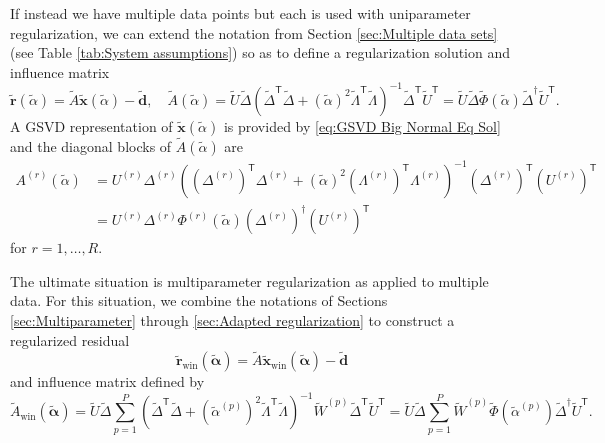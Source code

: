 \documentclass[12pt]{article}
\newcommand{\dVec}{\mathbf{d}}	%
\newcommand{\rVec}{\mathbf{r}}	%
\newcommand{\xVec}{\mathbf{x}}	%
\newcommand{\trans}[1]{{#1}^\mathsf{T}}	%
\newcommand{\inv}[1]{{#1}^{-1}}	%
\newcommand{\pinv}[1]{{#1}^\dagger}	%
\newcommand{\regparam}{\alpha}  %
\newcommand{\regparamVec}{\bm{\regparam}}   %
\newcommand{\regparamBig}{\widetilde{\regparam}}   %
\newcommand{\regparamVecBig}{\widetilde{\regparamVec}}   %
\newcommand{\xBig}{\widetilde{\xVec}}	%
\newcommand{\xWinBig}{\xBig_{\text{win}}}	%
\newcommand{\rBig}{\widetilde{\rVec}}	%
\newcommand{\rWinBig}{\rBig_{\text{win}}}	%
\newcommand{\dBig}{\widetilde{\dVec}}	%
\newcommand{\ABig}{\widetilde{A}}	%
\newcommand{\AWinBig}{\widetilde{A}_{\text{win}}}	%
\begin{document}
If instead we have multiple data points but each is used with uniparameter regularization, we can extend the notation from Section \ref{sec:Multiple data sets} (see Table \ref{tab:System assumptions}) so as to define a regularization solution and influence matrix
\begin{equation}
\label{eq:Big regularized residual}
\rBig(\widetilde{\regparam}) = \ABig\xBig(\widetilde{\regparam}) - \dBig, \quad \ABig(\regparamBig) = \widetilde{U}\widetilde{\Delta}\inv{\left(\trans{\widetilde{\Delta}}\widetilde{\Delta} + \left(\regparamBig\right)^2 \trans{\widetilde{\Lambda}}\widetilde{\Lambda}\right)}\trans{\widetilde{\Delta}}\trans{\widetilde{U}} = \widetilde{U}\widetilde{\Delta}\widetilde{\Phi}\left(\regparamBig\right)\pinv{\widetilde{\Delta}}\trans{\widetilde{U}}.
\end{equation}
A GSVD representation of $\xBig(\widetilde{\regparam})$ is provided by \eqref{eq:GSVD Big Normal Eq Sol} and the diagonal blocks of $\ABig(\regparamBig)$ are
\begin{align}
    A^{(r)}(\regparamBig) &= U^{(r)}\Delta^{(r)}\inv{\left(\trans{\left(\Delta^{(r)}\right)}\Delta^{(r)} + \left(\regparamBig\right)^2 \trans{\left(\Lambda^{(r)}\right)}\Lambda^{(r)}\right)}\trans{\left(\Delta^{(r)}\right)}\trans{\left(U^{(r)}\right)} \nonumber \\ 
    &= U^{(r)}\Delta^{(r)}\Phi^{(r)}\left(\regparamBig\right)\pinv{\left(\Delta^{(r)}\right)}\trans{\left(U^{(r)}\right)} \label{eq:Diagonal blocks}
\end{align}
for $r = 1,\ldots,R$. \par
The ultimate situation is multiparameter regularization as applied to multiple data. For this situation, we combine the notations of Sections \ref{sec:Multiparameter} through \ref{sec:Adapted regularization} to construct a regularized residual
\begin{equation}
\label{eq:Windowed Big regularized residual}
\rWinBig(\regparamVecBig) = \ABig\xWinBig(\regparamVecBig) - \dBig
\end{equation}
and influence matrix defined by
\begin{equation}
    \label{eq:Windowed Big Influence Matrix}
    \AWinBig(\regparamVecBig) = \widetilde{U}\widetilde{\Delta}\sum_{p=1}^{P}\inv{\left(\trans{\widetilde{\Delta}}\widetilde{\Delta} + \left(\regparamBig^{(p)}\right)^2 \trans{\widetilde{\Lambda}}\widetilde{\Lambda}\right)}\widetilde{W}^{(p)}\trans{\widetilde{\Delta}}\trans{\widetilde{U}} = \widetilde{U}\widetilde{\Delta}\sum_{p=1}^{P}\widetilde{W}^{(p)}\widetilde{\Phi}\left(\regparamBig^{(p)}\right)\pinv{\widetilde{\Delta}}\trans{\widetilde{U}}.
\end{equation}
\end{document}
